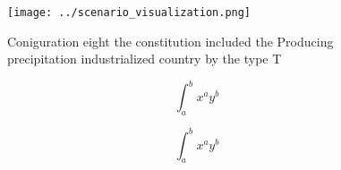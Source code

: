\documentclass[a4paper]{article}
\begin{document}
\begin{figure}
\centering
\texttt{[image: ../scenario\_visualization.png]}
\caption{Coniguration eight the constitution included the Producing precipitation industrialized country by the type T
}
\end{figure}
 
\[ \int_{a}^{b}{x^{a}y^{b}} \]

\[ \int_{a}^{b}{x^{a}y^{b}} \]
\end{document}
